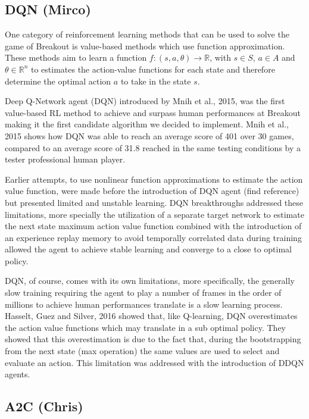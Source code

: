 \documentclass{article}
\begin{document}
\subsection{DQN (Mirco)}
One category of reinforcement learning methods that can be used to solve the game of Breakout is value-based methods which use function approximation.
These methods aim to learn a function $f: (s,a,\theta) \rightarrow \mathbb{R}$, with $s \in S$,  $a \in A$ and  $\theta \in \mathbb{R}^n$ to estimates the action-value functions for each state and therefore determine the optimal action $a$ to take in the state $s$.

Deep Q-Network agent (DQN) introduced by Mnih et al., 2015, was the first value-based RL method to achieve and surpass human performances at Breakout making it the first candidate algorithm we decided to implement.
Mnih et al., 2015 shows how DQN was able to reach an average score of 401 over 30 games, compared to an average score of 31.8 reached in the same testing conditions by a tester professional human player.

Earlier attempts, to use nonlinear function approximations to estimate the action value function, were made before the introduction of DQN agent (find reference) but presented limited and unstable learning.
DQN breakthroughs addressed these limitations, more specially the utilization of a separate target network to estimate the next state maximum action value function combined with the introduction of an experience replay memory to avoid temporally correlated data during training allowed the agent to achieve stable learning and converge to a close to optimal policy.

DQN, of course, comes with its own limitations, more specifically, the generally slow training requiring the agent to play a number of frames in the order of millions to achieve human performances translate is a slow learning process. Hasselt, Guez and Silver, 2016  showed that, like Q-learning, DQN overestimates the action value functions which may translate in a sub optimal policy. They showed that this overestimation is due to the fact that, during the bootstrapping from the next state (max operation) the same values are used to select and evaluate an action. This limitation was addressed with the introduction of DDQN agents.


\subsection{A2C (Chris)}
\end{document}
